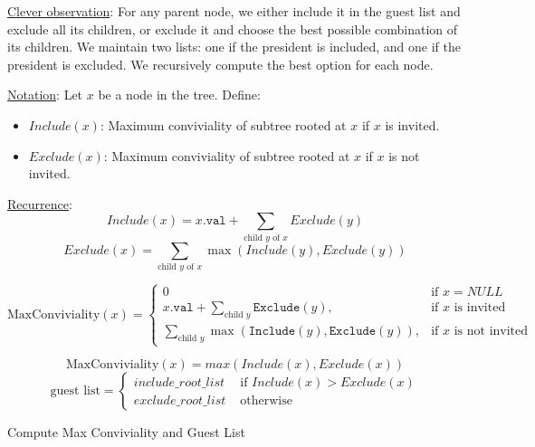 \begin{customsolutionbox}
    \underline{Clever observation}: For any parent node, we either include it in the guest list and exclude all its children, 
    or exclude it and choose the best possible combination of its children. We maintain two lists: one if the president is included, 
    and one if the president is excluded. We recursively compute the best option for each node.

    \underline{Notation}: Let $x$ be a node in the tree. Define:
    \begin{itemize}
        \item $Include(x)$: Maximum conviviality of subtree rooted at $x$ if $x$ is invited.
        \item $Exclude(x)$: Maximum conviviality of subtree rooted at $x$ if $x$ is not invited.
    \end{itemize}

    \underline{Recurrence}:
    \[
    Include(x) = x.\texttt{val} + \sum_{\text{child } y \text{ of } x} Exclude(y)
    \]
    \[
    Exclude(x) = \sum_{\text{child } y \text{ of } x} \max(Include(y), Exclude(y))
    \]

    \[
    \text{MaxConviviality}(x) =
    \begin{cases}
        0 & \text{if } x=NULL \\
        x.\texttt{val} + \sum\limits_{\text{child } y} \texttt{Exclude}(y), & \text{if } x \text{ is invited} \\
        \sum\limits_{\text{child } y} \max(\texttt{Include}(y), \texttt{Exclude}(y)), & \text{if } x \text{ is not invited}
    \end{cases}
    \]

    \[\text{MaxConviviality}(x) = max(Include(x), Exclude(x))\]
    \[\text{guest list} = \begin{cases}
        include\_root\_list & \text{ if } Include(x) > Exclude(x) \\
        exclude\_root\_list & \text{ otherwise}
    \end{cases}\]

    \begin{algorithm}[H]
        \caption{Compute Max Conviviality and Guest List}


\end{algorithm}
\end{customsolutionbox}
